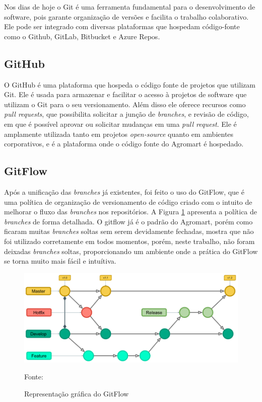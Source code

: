 Nos dias de hoje o Git é uma ferramenta fundamental para o desenvolvimento de software, pois garante organização de versões e facilita o trabalho colaborativo. Ele pode ser integrado com diversas plataformas que hospedam código-fonte como o Github, GitLab, Bitbucket e Azure Repos. 

\subsection{GitHub}
O GitHub é uma plataforma que hospeda o código fonte de projetos que utilizam Git. Ele é usada para armazenar e facilitar o acesso à projetos de software que utilizam o Git para o seu versionamento. Além disso ele oferece recursos como \textit{pull requests}, que possibilita solicitar a junção de \textit{branches}, e revisão de código, em que é possível aprovar ou solicitar mudanças em uma \textit{pull request}. Ele é amplamente utilizada tanto em projetos \textit{open-source} quanto em ambientes corporativos, e é a plataforma onde o código fonte do Agromart é hospedado.

\subsection{GitFlow}

Após a unificação das \textit{branches} já existentes, foi feito o uso do GitFlow, que é uma política de organização de versionamento de código criado com o intuito de melhorar o fluxo das \textit{branches} nos repositórios. A Figura \ref{gitflow} apresenta a política de \textit{branches} de forma detalhada. O gitflow já é o padrão do Agromart, porém como ficaram muitas \textit{branches} soltas sem serem devidamente fechadas, mostra que não foi utilizado corretamente em todos momentos, porém, neste trabalho, não foram deixadas \textit{branches} soltas, proporcionando um ambiente onde a prática do GitFlow se torna muito mais fácil e intuítiva.

\begin{figure}[h]
	\centering
	\includegraphics[keepaspectratio=true,scale=0.5]{figuras/gitflow.png}
	\caption{Representação gráfica do GitFlow}
    Fonte: \cite{alura2023}
	\label{gitflow}
\end{figure}


